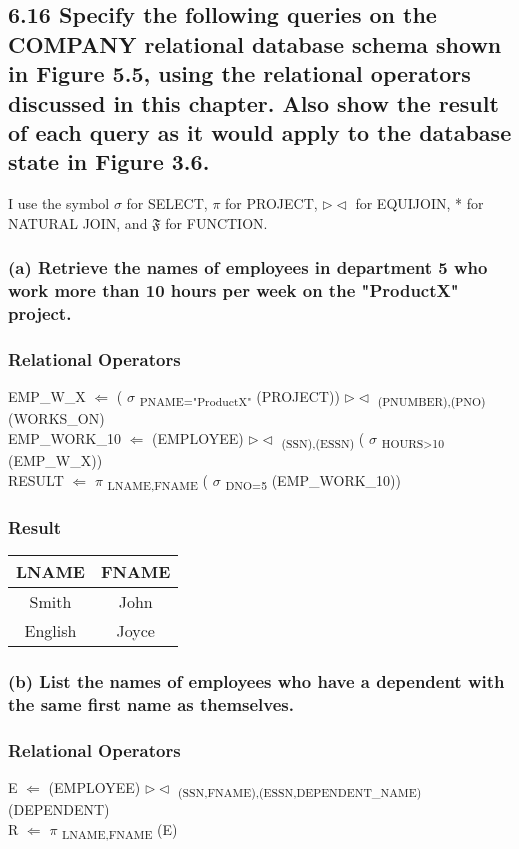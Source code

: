 \subsection*{6.16 Specify the following queries on the COMPANY relational database schema shown in Figure 5.5, using the relational operators discussed in this chapter. Also show the result of each query as it would apply to the database state in Figure 3.6.}
I use the symbol $\sigma$ for SELECT, $\pi$ for PROJECT, $\rhd\lhd$ for EQUIJOIN, * for NATURAL JOIN, and $\mathfrak{F}$ for FUNCTION.

\subsubsection*{(a) Retrieve the names of employees in department 5 who work more than 10 hours per week on the "ProductX" project.}
\subsubsection*{Relational Operators}
EMP\_W\_X $\Leftarrow$ ( $\sigma$ \textsubscript{PNAME="ProductX"} (PROJECT)) $\rhd\lhd$ \textsubscript{(PNUMBER),(PNO)} (WORKS\_ON) \\
EMP\_WORK\_10 $\Leftarrow$ (EMPLOYEE) $\rhd\lhd$ \textsubscript{(SSN),(ESSN)} ( $\sigma$ \textsubscript{HOURS>10} (EMP\_W\_X)) \\
RESULT $\Leftarrow$ $\pi$ \textsubscript{LNAME,FNAME} ( $\sigma$ \textsubscript{DNO=5} (EMP\_WORK\_10))

\subsubsection*{Result}
\begin{center}
\begin{tabular}{ c | c }
  LNAME & FNAME \\ \hline
  Smith & John \\
  English & Joyce \\
\end{tabular}
\end{center}

\subsubsection*{(b) List the names of employees who have a dependent with the same first name as themselves.}
\subsubsection*{Relational Operators}
E $\Leftarrow$ (EMPLOYEE) $\rhd\lhd$ \textsubscript{(SSN,FNAME),(ESSN,DEPENDENT\_NAME)} (DEPENDENT)\\
R $\Leftarrow$ $\pi$ \textsubscript{LNAME,FNAME} (E)

